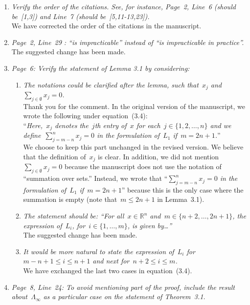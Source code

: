 \documentclass{article}
\begin{document}
\begin{enumerate}
    \item \textit{Verify the order of the citations. See, for instance, Page~2, Line~6 (should be~[1,3]) and Line~7 (should be~[5,11-13,23]).}\\
    We have corrected the order of the citations in the manuscript.
    \item \textit{Page~2, Line~29 : ``is impracticable'' instead of ``is impracticable in practice''.}\\
    The suggested change has been made.
    \item \textit{Page~6: Verify the statement of Lemma 3.1 by considering:}
    \begin{enumerate}
        \item \textit{The notations could be clarified after the lemma, such that~$x_j$ and~$\sum_{j \in \emptyset} x_j = 0$.}\\
        Thank you for the comment.
        In the original version of the manuscript, we wrote the following under equation~(3.4):\\[\baselineskip]
        ``\textit{Here,~$x_j$ denotes the~$j$th entry of~$x$ for each~$j \in \{ 1, 2, \dots, n \}$ and we define~$\sum_{j = m - n}^n x_j = 0$ in the formulation of~$L_1$ if~$m = 2n + 1$.}''\\[\baselineskip]
        We choose to keep this part unchanged in the revised version.
        We believe that the definition of~$x_j$ is clear.
        In addition, we did not mention~$\sum_{j \in \emptyset} x_j = 0$ because the manuscript does not use the notation of ``summation over sets.''
        Instead, we wrote that ``\textit{$\sum_{j = m - n}^n x_j = 0$ in the formulation of~$L_1$ if~$m = 2n + 1$}'' because this is the only case where the summation is empty (note that~$m \le 2n + 1$ in Lemma~3.1).
        \item \textit{The statement should be: ``For all~$x \in \mathbb{R}^n$ and~$m \in \{ n + 2, \dots, 2n + 1 \}$, the expression of~$L_i$, for~$i \in \{ 1, \dots, m \}$, is given by\dots''}\\
        The suggested change has been made.
        \item \textit{It would be more natural to state the expression of~$L_i$ for~$m - n + 1 \le i \le n + 1$ and next for~$n + 2 \le i \le m$.}\\
        We have exchanged the last two cases in equation~(3.4).
    \end{enumerate}
    \item \textit{Page~8, Line~24: To avoid mentioning part of the proof, include the result about~$\Lambda_{\infty}$ as a particular case on the statement of Theorem~3.1.}\\

\end{enumerate}
\end{document}
